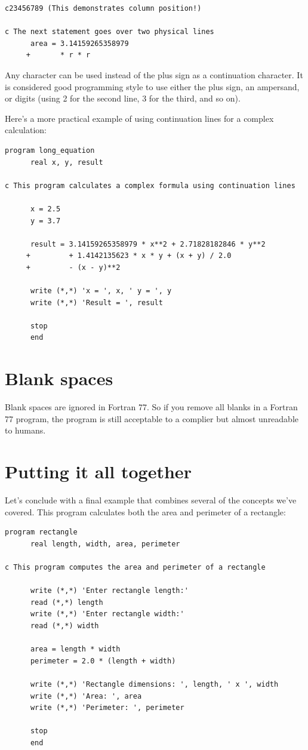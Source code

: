\begin{lstlisting}[style=fortran77]
c23456789 (This demonstrates column position!)

c The next statement goes over two physical lines
      area = 3.14159265358979
     +       * r * r
\end{lstlisting}

Any character can be used instead of the plus sign as a continuation character. It is considered good programming style to use either the plus sign, an ampersand, or digits (using 2 for the second line, 3 for the third, and so on).

Here's a more practical example of using continuation lines for a complex calculation:

\begin{lstlisting}[style=fortran77]
      program long_equation
      real x, y, result
      
c This program calculates a complex formula using continuation lines
      
      x = 2.5
      y = 3.7
      
      result = 3.14159265358979 * x**2 + 2.71828182846 * y**2 
     +         + 1.4142135623 * x * y + (x + y) / 2.0
     +         - (x - y)**2
      
      write (*,*) 'x = ', x, ' y = ', y
      write (*,*) 'Result = ', result
      
      stop
      end
\end{lstlisting}

\section{Blank spaces}

Blank spaces are ignored in Fortran 77. So if you remove all blanks in a Fortran 77 program, the program is still acceptable to a complier but almost unreadable to humans.

\section{Putting it all together}

Let's conclude with a final example that combines several of the concepts we've covered. This program calculates both the area and perimeter of a rectangle:

\begin{lstlisting}[style=fortran77]
      program rectangle
      real length, width, area, perimeter
      
c This program computes the area and perimeter of a rectangle
      
      write (*,*) 'Enter rectangle length:'
      read (*,*) length
      write (*,*) 'Enter rectangle width:'
      read (*,*) width
      
      area = length * width
      perimeter = 2.0 * (length + width)
      
      write (*,*) 'Rectangle dimensions: ', length, ' x ', width
      write (*,*) 'Area: ', area
      write (*,*) 'Perimeter: ', perimeter
      
      stop
      end
\end{lstlisting}

